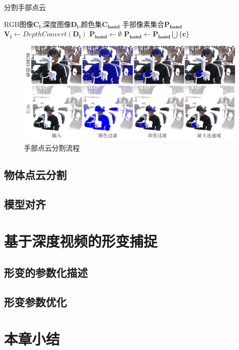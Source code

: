 \begin{algorithm}
    \fangsong
    \caption{分割手部点云}
    \label{alg_seg_hand}
    \begin{algorithmic}[1]
        \Require RGB图像$\mathbf{C_i}$,深度图像$\mathbf{D_i}$,颜色集$\mathbf{C_{hand}}$
        \Ensure 手部像素集合$\mathbf{P_{hand}}$
        \State $\mathbf{V_i} \gets DepthConvert(\mathbf{D_i})$ 
        \State $\mathbf{P_{hand}} \gets \mathbf{\emptyset}$
                   \State $\mathbf{P_{hand}} \gets \mathbf{P_{hand}} \bigcup \{\mathbf{c}\}$
                \EndIf
            \EndFor
        \EndFor
    \end{algorithmic}
\end{algorithm}

\begin{figure}[h]
    \centering
    \includegraphics[width = \textwidth]{./Pictures/FindingHand.png}
    \caption{手部点云分割流程}
    \label{finding_hand}
\end{figure}
\subsection{物体点云分割}
\subsection{模型对齐}

\section{基于深度视频的形变捕捉}
\subsection{形变的参数化描述}
\subsection{形变参数优化}

\section{本章小结}